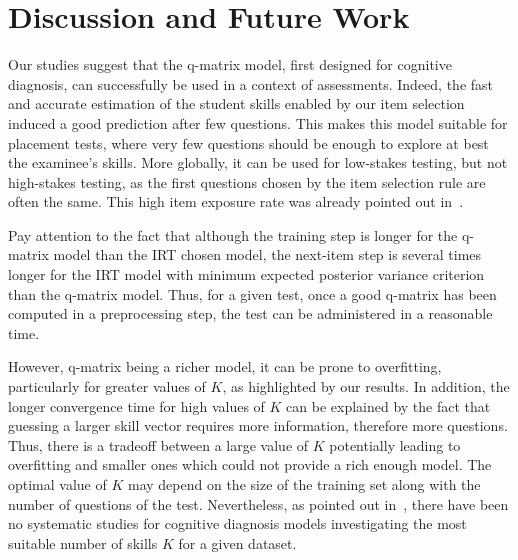 \documentclass{sig-alternate}
\begin{document}
\section{Discussion and Future Work}

Our studies suggest that the q-matrix model, first designed for cognitive diagnosis, can successfully be used in a context of assessments. Indeed, the fast and accurate estimation of the student skills enabled by our item selection induced a good prediction after few questions. This makes this model suitable for placement tests, where very few questions should be enough to explore at best the examinee's skills. More globally, it can be used for low-stakes testing, but not high-stakes testing, as the first questions chosen by the item selection rule are often the same. This high item exposure rate was already pointed out in~\citep{Cheng2009}.

Pay attention to the fact that although the training step is longer for the q-matrix model than the IRT chosen model, the next-item step is several times longer for the IRT model with minimum expected posterior variance criterion than the q-matrix model. Thus, for a given test, once a good q-matrix has been computed in a preprocessing step, the test can be administered in a reasonable time. %

However, q-matrix being a richer model, it can be prone to overfitting, particularly for greater values of $K$, as highlighted by our results. In addition, the longer convergence time for high values of $K$ can be explained by the fact that guessing a larger skill vector requires more information, therefore more questions. Thus, there is a tradeoff between a large value of $K$ potentially leading to overfitting and smaller ones which could not provide a rich enough model. The optimal value of $K$ may depend on the size of the training set along with the number of questions of the test. Nevertheless, as pointed out in~\citep{Huebner2010}, there have been no systematic studies for cognitive diagnosis models investigating the most suitable number of skills $K$ for a given dataset.


\end{document}
